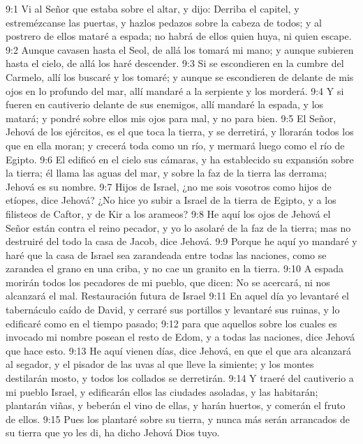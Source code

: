9:1   Vi al Señor que estaba sobre el altar, y dijo: Derriba el capitel, y estremézcanse las puertas, y hazlos pedazos sobre la cabeza de todos; y al postrero de ellos mataré a espada; no habrá de ellos quien huya, ni quien escape.   
9:2 Aunque cavasen hasta el Seol, de allá los tomará mi mano; y aunque subieren hasta el cielo, de allá los haré descender.   
9:3 Si se escondieren en la cumbre del Carmelo, allí los buscaré y los tomaré; y aunque se escondieren de delante de mis ojos en lo profundo del mar, allí mandaré a la serpiente y los morderá.   
9:4 Y si fueren en cautiverio delante de sus enemigos, allí mandaré la espada, y los matará; y pondré sobre ellos mis ojos para mal, y no para bien.   
9:5 El Señor, Jehová de los ejércitos, es el que toca la tierra, y se derretirá, y llorarán todos los que en ella moran; y crecerá toda como un río, y mermará luego como el río de Egipto.   
9:6 El edificó en el cielo sus cámaras, y ha establecido su expansión sobre la tierra; él llama las aguas del mar, y sobre la faz de la tierra las derrama; Jehová es su nombre.   
9:7 Hijos de Israel, ¿no me sois vosotros como hijos de etíopes, dice Jehová? ¿No hice yo subir a Israel de la tierra de Egipto, y a los filisteos de Caftor, y de Kir a los arameos?   
9:8 He aquí los ojos de Jehová el Señor están contra el reino pecador, y yo lo asolaré de la faz de la tierra; mas no destruiré del todo la casa de Jacob, dice Jehová. 
9:9 Porque he aquí yo mandaré y haré que la casa de Israel sea zarandeada entre todas las naciones, como se zarandea el grano en una criba, y no cae un granito en la tierra.   
9:10 A espada morirán todos los pecadores de mi pueblo, que dicen: No se acercará, ni nos alcanzará el mal.   
Restauración futura de Israel   
9:11 En aquel día yo levantaré el tabernáculo caído de David, y cerraré sus portillos y levantaré sus ruinas, y lo edificaré como en el tiempo pasado;   
9:12 para que aquellos sobre los cuales es invocado mi nombre posean el resto de Edom, y a todas las naciones, dice Jehová que hace esto. 
9:13 He aquí vienen días, dice Jehová, en que el que ara alcanzará al segador, y el pisador de las uvas al que lleve la simiente; y los montes destilarán mosto, y todos los collados se derretirán.   
9:14 Y traeré del cautiverio a mi pueblo Israel, y edificarán ellos las ciudades asoladas, y las habitarán; plantarán viñas, y beberán el vino de ellas, y harán huertos, y comerán el fruto de ellos.   
9:15 Pues los plantaré sobre su tierra, y nunca más serán arrancados de su tierra que yo les di, ha dicho Jehová Dios tuyo.